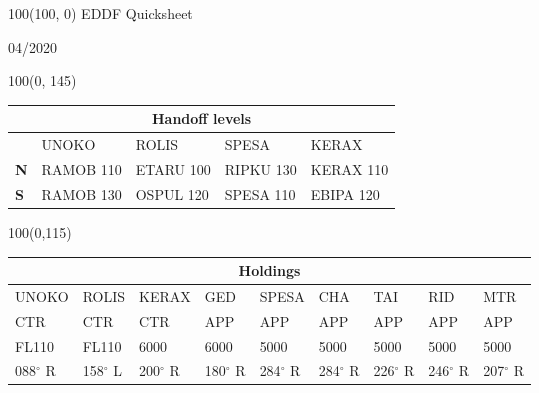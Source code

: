 \documentclass[10pt,landscape,a4paper]{article}
\begin{document}
\begin{textblock}{100}(100, 0)
  \large
  \centering
  EDDF Quicksheet

  04/2020
\end{textblock}

\begin{textblock}{100}(0, 145)
\begin{table}[]
\begin{tabular}{|l|l|l|l|l|}
\multicolumn{5}{c}{\textbf{Handoff levels}}              \\ \hline
           & UNOKO     & ROLIS     & SPESA     & KERAX     \\ \hline
\textbf{N} & RAMOB 110 & ETARU 100 & RIPKU 130 & KERAX 110 \\
\textbf{S} & RAMOB 130 & OSPUL 120 & SPESA 110 & EBIPA 120 \\ \hline
\end{tabular}
\end{table}
\end{textblock}

\begin{textblock}{100}(0,115)
\begin{table}[]
\begin{tabular}{|l|l|l|l|l|l|l|l|l|}

\multicolumn{9}{c}{\textbf{Holdings}}                                        \\ \hline
UNOKO  & ROLIS  & KERAX  & GED    & SPESA  & CHA    & TAI    & RID    & MTR    \\ \hline
CTR    & CTR    & CTR    & APP    & APP    & APP    & APP    & APP    & APP    \\
FL110  & FL110  & 6000   & 6000   & 5000   & 5000   & 5000   & 5000   & 5000   \\
088$^\circ$ R & 158$^\circ$ L & 200$^\circ$ R & 180$^\circ$ R & 284$^\circ$ R & 284$^\circ$ R & 226$^\circ$ R & 246$^\circ$ R & 207$^\circ$ R \\ \hline
\end{tabular}
\end{table}
\end{textblock}
\end{document}

